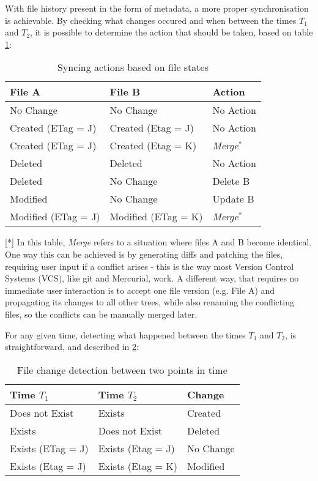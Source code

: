     With file history present in the form of metadata, a more proper synchronisation is achievable. By checking what changes occured and when between the times $T_1$ and $T_2$, it is possible to determine the action that should be taken, based on table \ref{table:simple-sync-actions}:\\

    \begin{table}[H]
      \centering
      \begin{tabular}{|l|l|l|}
        \hline \textbf{File A} & \textbf{File B} & \textbf{Action} \\ \hline \hline
         No Change & No Change & No Action \\ \hline
         Created (ETag = J) & Created (Etag = J) & No Action \\ \hline
         Created (ETag = J) & Created (Etag = K) & \emph{Merge$^*$} \\ \hline
         Deleted & Deleted & No Action \\ \hline
         Deleted & No Change & Delete B \\ \hline
         Modified & No Change & Update B \\ \hline
         Modified (ETag = J) & Modified (ETag = K) & \emph{Merge$^*$} \\ \hline
      \end{tabular}
      \caption{Syncing actions based on file states}
      \label{table:simple-sync-actions}
  \end{table}

    [*] In this table, \emph{Merge} refers to a situation where files A and B become identical. One way this can be achieved is by generating diffs and patching the files, requiring user input if a conflict arises - this is the way most Version Control Systems (VCS), like git and Mercurial, work. A different way, that requires no immediate user interaction is to accept one file version (e.g. File A) and propagating its changes to all other trees, while also renaming the conflicting files, so the conflicts can be manually merged later.

    For any given time, detecting what happened between the times $T_1$ and $T_2$, is straightforward, and described in \ref{table:time-change-detection}:\\

    \begin{table}[H]
      \centering
      \begin{tabular}{|l|l|l|}
        \hline \textbf{Time $T_1$} & \textbf{Time $T_2$} & \textbf{Change}\\ \hline \hline
         Does not Exist & Exists & Created \\ \hline
         Exists & Does not Exist & Deleted \\ \hline
         Exists (ETag = J) & Exists (Etag = J) & No Change \\ \hline
         Exists (Etag = J) & Exists (Etag = K) & Modified \\ \hline
      \end{tabular}
    \caption{File change detection between two points in time}
    \label{table:time-change-detection}
    \end{table}

